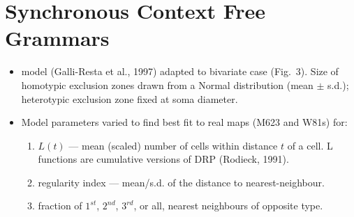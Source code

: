 \documentclass[noback]{poster}
\begin{document}
\section{Synchronous Context Free Grammars}


\begin{itemize}
\item \dmin model (Galli-Resta et al., 1997) adapted to bivariate case
  (Fig.~3).  Size of homotypic exclusion zones drawn from a Normal
  distribution (mean $\pm$ s.d.); heterotypic exclusion zone fixed at
  soma diameter.
  
\item Model parameters varied to find best fit to real maps (M623 and
  W81s) for:
  \begin{enumerate}
  \item $L(t)$ --- mean (scaled) number of cells within distance
    $t$ of a cell. L functions are cumulative versions of DRP
    (Rodieck, 1991).
  \item regularity index --- mean/s.d. of the distance to
    nearest-neighbour.
    
  \item  fraction of $1^{st}$, $2^{nd}$, $3^{rd}$, or all,
    nearest neighbours of opposite type.
  \end{enumerate}
\end{itemize}  
\columnbreak
\end{document}
